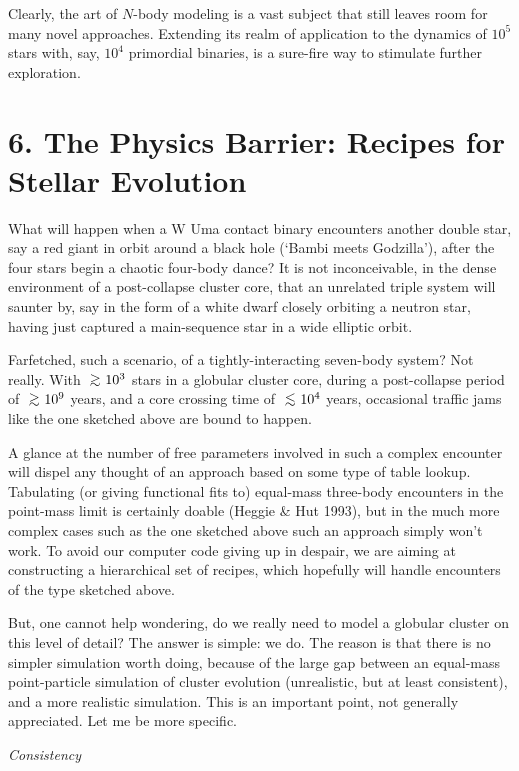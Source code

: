 Clearly, the art of $N$-body modeling is a vast subject that still
leaves room for many novel approaches.  Extending its realm of
application to the dynamics of $10^5$ stars with, say, $10^4$
primordial binaries, is a sure-fire way to stimulate further
exploration.

\section{6. The Physics Barrier: Recipes for Stellar Evolution}

What will happen when a W Uma contact binary encounters another double
star, say a red giant in orbit around a black hole (`Bambi meets
Godzilla'), after the four stars begin a chaotic four-body dance?  It
is not inconceivable, in the dense environment of a post-collapse
cluster core, that an unrelated triple system will saunter by, say in
the form of a white dwarf closely orbiting a neutron star, having just
captured a main-sequence star in a wide elliptic orbit.

Farfetched, such a scenario, of a tightly-interacting seven-body
system?  Not really.  With $\simgt 10^3$ stars in a globular cluster
core, during a post-collapse period of $\simgt 10^9$ years, and a core
crossing time of $\simlt 10^4$ years, occasional traffic jams like the
one sketched above are bound to happen.

A glance at the number of free parameters involved in such a complex
encounter will dispel any thought of an approach based on some type of
table lookup.  Tabulating (or giving functional fits to) equal-mass
three-body encounters in the point-mass limit is certainly doable
(Heggie \& Hut 1993), but in the much more complex cases such as the
one sketched above such an approach simply won't work.  To avoid our
computer code giving up in despair, we are aiming at constructing a
hierarchical set of recipes, which hopefully will handle encounters of
the type sketched above.

But, one cannot help wondering, do we really need to model a globular
cluster on this level of detail?  The answer is simple: we do.  The
reason is that there is no simpler simulation worth doing, because of
the large gap between an equal-mass point-particle simulation of
cluster evolution (unrealistic, but at least consistent), and a more
realistic simulation.  This is an important point, not generally
appreciated.  Let me be more specific.

\bigskip
\noindent
{\it Consistency}
\medskip

